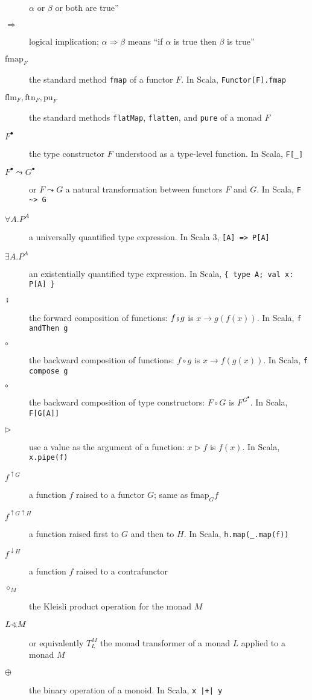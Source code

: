 \begin{description}
$\alpha$ or $\beta$ or both are true\textsf{''}
\item [{$\Rightarrow$}] logical implication; $\alpha\Rightarrow\beta$
means \textsf{``}if $\alpha$ is true then $\beta$ is true\textsf{''}
\item [{$\text{fmap}_{F}$}] the standard method \lstinline!fmap! of a
functor $F$. In Scala, \lstinline!Functor[F].fmap!
\item [{$\text{flm}_{F},\text{ftn}_{F},\text{pu}_{F}$}] the standard methods
\lstinline!flatMap!, \lstinline!flatten!, and \lstinline!pure!
of a monad $F$
\item [{$F^{\bullet}$}] the type constructor $F$ understood as a type-level
function. In Scala, \lstinline!F[_]! 
\item [{$F^{\bullet}\leadsto G^{\bullet}$}] or $F\leadsto G$ a natural
transformation between functors $F$ and $G$. In Scala, \lstinline!F ~> G!
\item [{$\forall A.P^{A}$}] a universally quantified type expression.
In Scala 3, \lstinline![A] => P[A]!
\item [{$\exists A.P^{A}$}] an existentially quantified type expression.
In Scala, \lstinline!{ type A; val x: P[A] }! 
\item [{$\bef$}] the forward composition of functions: $f\bef g$ is $x\rightarrow g(f(x))$.
In Scala, \lstinline!f andThen g!
\item [{$\circ$}] the backward composition of functions: $f\circ g$ is
$x\rightarrow f(g(x))$. In Scala, \lstinline!f compose g!
\item [{$\circ$}] the backward composition of type constructors: $F\circ G$
is $F^{G^{\bullet}}$. In Scala, \lstinline!F[G[A]]! 
\item [{$\triangleright$}] use a value as the argument of a function:
$x\triangleright f$ is $f(x)$. In Scala, \lstinline!x.pipe(f)!
\item [{$f^{\uparrow G}$}] a function $f$ raised to a functor $G$; same
as $\text{fmap}_{G}f$
\item [{$f^{\uparrow G\uparrow H}$}] a function raised first to $G$ and
then to $H$. In Scala, \lstinline!h.map(_.map(f))! 
\item [{$f^{\downarrow H}$}] a function $f$ raised to a contrafunctor 
\item [{$\diamond_{M}$}] the Kleisli product operation for the monad $M$
\item [{$L\varangle M$}] or equivalently $T_{L}^{M}$ \textemdash{} the
monad transformer of a monad $L$ applied to a monad $M$
\item [{$\oplus$}] the binary operation of a monoid. In Scala, \lstinline!x |+| y!

\end{description}
